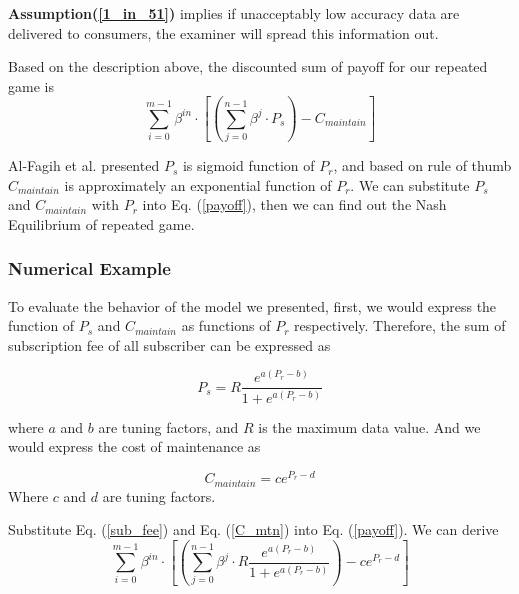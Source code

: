 \documentclass[journal,article,submit,moreauthors,pdftex]{Definitions/mdpi}
\begin{document}
\textbf{Assumption(\ref{1_in_51})}  implies if unacceptably low accuracy data are delivered to consumers, the examiner will spread this information out.


Based on the description above, the discounted sum of payoff for our repeated game is
\begin{equation} \label{payoff}
    \sum_{i=0}^{m - 1}{\beta^{in}\cdot [(\sum_{j=0}^{n - 1} \beta^j \cdot P_s) - C_{maintain}]}
\end{equation}

Al-Fagih et al. presented\cite{DataPrice} $P_s$ is sigmoid function of $P_r$, and based on rule of thumb $C_{maintain}$ is approximately an exponential function of $P_r$. We can substitute $P_s$ and $C_{maintain}$ with $P_r$ into Eq. (\ref{payoff}), then we can find out the Nash Equilibrium of repeated game.

\subsubsection{Numerical Example}
To evaluate the behavior of the model we presented, first, we would express the function of $P_s$ and $C_{maintain}$ as functions of $P_r$ respectively. Therefore, the sum of subscription fee of all subscriber can be expressed as

\begin{equation} \label{sub_fee}
    P_s = R \frac{e^{a (P_r - b)}}{1 + e^{a (P_r - b)}}
\end{equation}

where $a$ and $b$ are tuning factors, and $R$ is the maximum data value.
And we would express the cost of maintenance as

\begin{equation} \label{C_mtn}
    C_{maintain} = ce^{P_r - d}
\end{equation}
Where $c$ and $d$ are tuning factors.

Substitute Eq. (\ref{sub_fee}) and Eq. (\ref{C_mtn}) into Eq. (\ref{payoff}). We can derive
\begin{equation} \label{payoff_Pr}
    \sum_{i=0}^{m - 1}{\beta^{in}\cdot [(\sum_{j=0}^{n - 1} \beta^j \cdot R \frac{e^{a (P_r - b)}}{1 + e^{a (P_r - b)}}) - ce^{P_r - d}]}
\end{equation}
\end{document}
